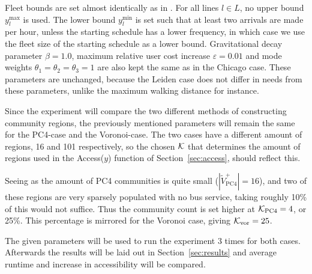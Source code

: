 Fleet bounds are set almost identically as in \cite{rumpf}. For all lines $l\in L$, no upper bound $y_l^\text{max}$ is used. The lower bound $y_l^\text{min}$ is set such that at least two arrivals are made per hour, unless the starting schedule has a lower frequency, in which case we use the fleet size of the starting schedule as a lower bound. Gravitational decay parameter $\beta = 1.0$, maximum relative user cost increase $\varepsilon = 0.01$ and mode weights $\theta_1=\theta_2=\theta_3 = 1$ are also kept the same as in the Chicago case. These parameters are unchanged, because the Leiden case does not differ in needs from these parameters, unlike the maximum walking distance for instance.

Since the experiment will compare the two different methods of constructing community regions, the previously mentioned parameters will remain the same for the PC4-case and the Voronoi-case. The two cases have a different amount of regions, 16 and 101 respectively, so the chosen $\mathcal{K}$ that determines the amount of regions used in the Access($y$) function of Section~\ref{sec:access}, should reflect this.

Seeing as the amount of PC4 communities is quite small ($|\tilde V^+_\text{PC4}| = 16$), and two of these regions are very sparsely populated with no bus service, taking roughly 10\% of this would not suffice. Thus the community count is set higher at $\mathcal{K}_\text{PC4} = 4$, or 25\%. This percentage is mirrored for the Voronoi case, giving $\mathcal{K}_\text{vor} = 25$.

The given parameters will be used to run the experiment 3 times for both cases. Afterwards the results will be laid out in Section~\ref{sec:results} and average runtime and increase in accessibility will be compared.

